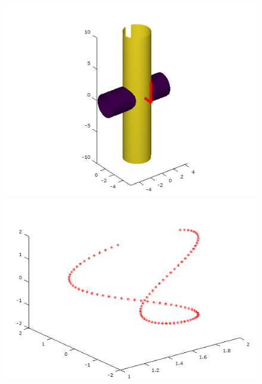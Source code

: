 \documentclass[12pt]{article}
\begin{document}
\begin{minipage}{\textwidth}
\begin{figure}[H]
	    \includegraphics[scale=0.4]{primer7_3}
    	\includegraphics[scale=0.4]{primer7_4} 
    \end{figure}    
    \end{minipage}
    
\end{document}
